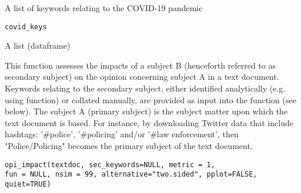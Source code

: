 \documentclass[a4paper]{book}
\begin{document}
%
\begin{Description}\relax
A list of keywords relating to the COVID-19 pandemic
\end{Description}
%
\begin{Usage}
\begin{verbatim}
covid_keys
\end{verbatim}
\end{Usage}
%
\begin{Format}
A list (dataframe)
\end{Format}
%
\begin{Description}\relax
This function assesses the impacts of a
subject B (henceforth referred to as
secondary subject) on the opinion concerning subject A in
a text document. Keywords relating to the secondary subject,
either identified analytically (e.g. using
 function) or collated manually, are provided
as input into the function (see below). The subject A
(primary subject) is the subject matter upon which the
text document is based. For instance, by downloading Twitter
data that include hashtags: '\#police', '\#policing' and/or
'\#law enforcement', then "Police/Policing"
becomes the primary subject of the text document.
\end{Description}
%
\begin{Usage}
\begin{verbatim}
opi_impact(textdoc, sec_keywords=NULL, metric = 1,
fun = NULL, nsim = 99, alternative="two.sided", pplot=FALSE,
quiet=TRUE)
\end{verbatim}
\end{Usage}
%
\end{document}
